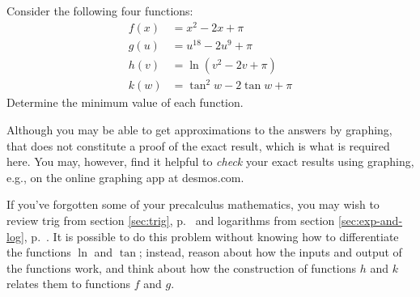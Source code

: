 Consider the following four functions:
\begin{align*}
  f(x) &= x^2-2x+\pi \\
  g(u) &= u^{18}-2u^9+\pi \\
  h(v) &= \ln(v^2-2v+\pi) \\
  k(w) &= \tan^2 w-2\tan w+\pi
\end{align*}
Determine the minimum value of each function.

Although you may be able to get approximations to the answers by
graphing, that does not constitute a proof of the exact result, which
is what is required here. You may, however, find it helpful to \emph{check}
your exact results using graphing, e.g., on the online graphing app
at desmos.com.

If you've forgotten some of your precalculus mathematics, you
may wish to review trig from
section \ref{sec:trig}, p.~\pageref{sec:trig} and logarithms
from section \ref{sec:exp-and-log}, p.~\pageref{sec:exp-and-log}.
It is possible
to do this problem without knowing how to differentiate the functions
$\ln$ and $\tan$; instead, reason about how the inputs and output of
the functions work, and think about how the construction of functions $h$ and $k$
relates them to functions $f$ and $g$.\answercheck
